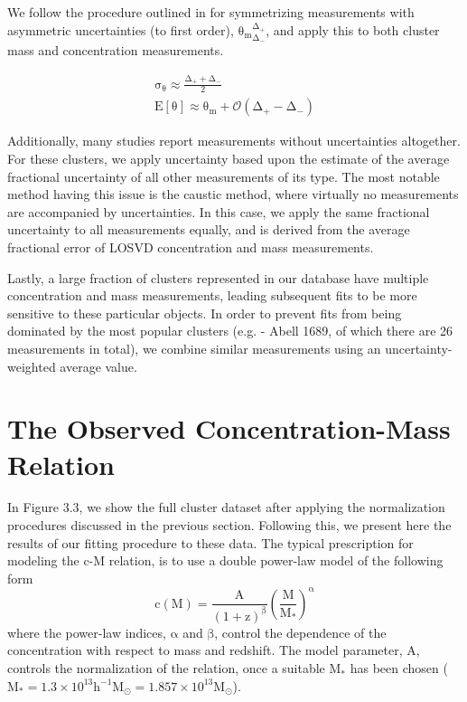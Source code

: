 We follow the procedure outlined in \citet{DA04.1} for symmetrizing
measurements with asymmetric uncertainties (to first order),
$\mathrm{{\theta_{m}}^{\Delta_{+}}_{\Delta_{-}}}$, and apply this to both
cluster mass and concentration measurements.

\begin{subequations}
\begin{align}
\mathrm{\sigma_{\theta} \approx \frac{\Delta_{+} + \Delta_{-}}{2}}\\
\mathrm{E[\theta] \approx \theta_{m} + \mathcal{O}(\Delta_{+} - \Delta_{-})}
\end{align}
\end{subequations}

Additionally, many studies report measurements without uncertainties
altogether. For these clusters, we apply uncertainty based upon the
estimate of the average fractional uncertainty of all other
measurements of its type. The most notable method having this issue is
the caustic method, where virtually no measurements are accompanied by
uncertainties. In this case, we apply the same fractional uncertainty
to all measurements equally, and is derived from the average fractional error
of LOSVD concentration and mass measurements.

Lastly, a large fraction of clusters represented in our database have multiple
concentration and mass measurements, leading subsequent fits to be more
sensitive to these particular objects. In order to prevent fits from being
dominated by the most popular clusters (e.g. - Abell 1689, of which there are
26 measurements in total), we combine similar measurements using an
uncertainty-weighted average value.

\section[The Observed c-M Relation]{The Observed Concentration-Mass Relation}

In Figure 3.3, we show the full cluster dataset after applying the normalization
procedures discussed in the previous section. Following this,
we present here the results of our fitting procedure to these data. The typical
prescription for modeling the c-M relation, is to use a double power-law model
of the following form
\begin{equation}
\mathrm{c(M) = \frac{A}{\left(1+z\right)^{\beta}} \left(\frac{M}{M_{*}}\right)^{\alpha}}
\end{equation}
where the power-law indices, $\mathrm{\alpha}$ and $\mathrm{\beta}$, control
the dependence of the concentration with respect to mass and redshift. The
model parameter, $\mathrm{A}$, controls the normalization of the relation, once a
suitable $\mathrm{M_{*}}$ has been chosen ($\mathrm{M_{*}=1.3\times10^{13}
  h^{-1} M_{\odot} = 1.857\times 10^{13} M_{\odot}}$). 

